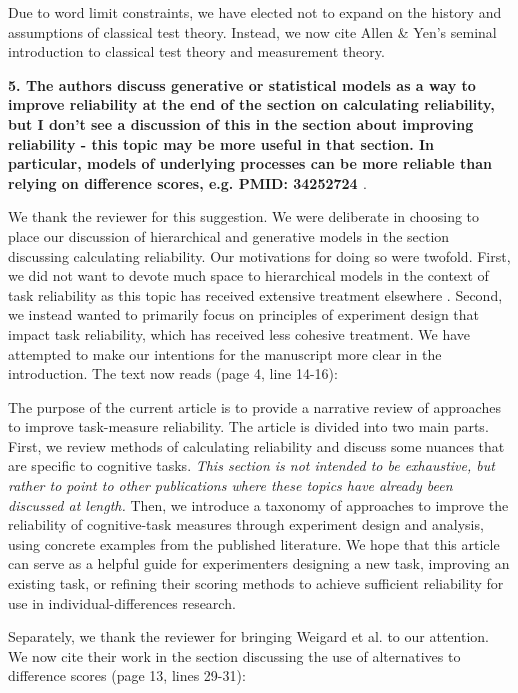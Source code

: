 \documentclass[a4paper,12pt]{article}
\begin{document}
Due to word limit constraints, we have elected not to expand on the history and assumptions of classical test theory. Instead, we now cite Allen \& Yen's \cite{allen2001introduction} seminal introduction to classical test theory and measurement theory. 

\textbf{5. The authors discuss generative or statistical models as a way to improve reliability at the end of the section on calculating reliability, but I don't see a discussion of this in the section about improving reliability - this topic may be more useful in that section. In particular, models of underlying processes can be more reliable than relying on difference scores, e.g. PMID: 34252724 \cite{weigard2021cognitive}}.

We thank the reviewer for this suggestion. We were deliberate in choosing to place our discussion of hierarchical and generative models in the section discussing calculating reliability. Our motivations for doing so were twofold. First, we did not want to devote much space to hierarchical models in the context of task reliability as this topic has received extensive treatment elsewhere \cite{haines2020learning, Rouder2019-am, chen2021trial}. Second, we instead wanted to primarily focus on principles of experiment design that impact task reliability, which has received less cohesive treatment. We have attempted to make our intentions for the manuscript more clear in the introduction. The text now reads (page 4, line 14-16):

\begin{displayquote}
    The purpose of the current article is to provide a narrative review of approaches to improve task-measure reliability. The article is divided into two main parts. First, we review methods of calculating reliability and discuss some nuances that are specific to cognitive tasks. \textit{This section is not intended to be exhaustive, but rather to point to other publications where these topics have already been discussed at length.} Then, we introduce a taxonomy of approaches to improve the reliability of cognitive-task measures through experiment design and analysis, using concrete examples from the published literature. We hope that this article can serve as a helpful guide for experimenters designing a new task, improving an existing task, or refining their scoring methods to achieve sufficient reliability for use in individual-differences research.
\end{displayquote}

Separately, we thank the reviewer for bringing Weigard et al. to our attention. We now cite their work in the section discussing the use of alternatives to difference scores (page 13, lines 29-31):
\end{document}
